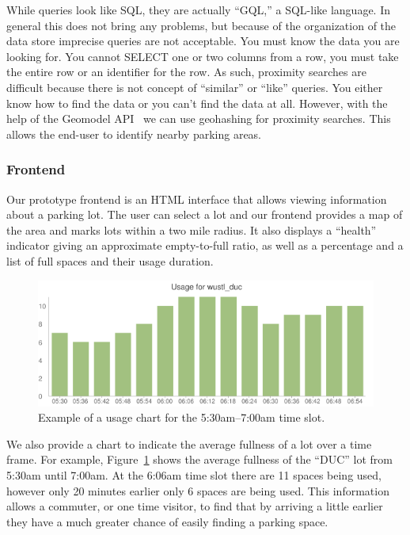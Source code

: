 \documentclass{acm_proc}
\begin{document}
While queries look like SQL, they are actually ``GQL,'' a SQL-like
language.
In general this does not bring any problems, but because of the
organization of the data store imprecise queries are not acceptable.
You must know the data you are looking for.
You cannot SELECT one or two columns from a row, you
must take the entire row or an identifier for the row.
As such, proximity searches are difficult because there is not concept of
``similar'' or ``like'' queries.
You either know how to find the data or you can't find the data at all.
However, with the help of the Geomodel API~\cite{geomodel} we can
use geohashing for proximity searches.
This allows the end-user to identify nearby parking areas.

\subsubsection{Frontend}

Our prototype frontend is an HTML interface that allows viewing information
about a parking lot.
The user can select a lot and our frontend provides a map of the area and
marks lots within a two mile radius.
It also displays a ``health'' indicator giving an approximate empty-to-full
ratio, as well as a percentage and a list of full spaces and their usage
duration.

\begin{figure}
    \begin{center}
		\includegraphics[width=\columnwidth]{figures/fullness-chart}
	\end{center}
	\caption{Example of a usage chart for the 5:30am--7:00am time slot.}
	\label{fig:fullness-chart}
\end{figure}

We also provide a chart to indicate the average fullness of a lot over a
time frame.
For example, Figure~\ref{fig:fullness-chart} shows the average fullness of
the ``DUC'' lot from 5:30am until 7:00am.
At the 6:06am time slot there are 11 spaces being used, however only 20
minutes earlier only 6 spaces are being used.
This information allows a commuter, or one time visitor, to find that by
arriving a little earlier they have a much greater chance of easily finding
a parking space.
\end{document}
